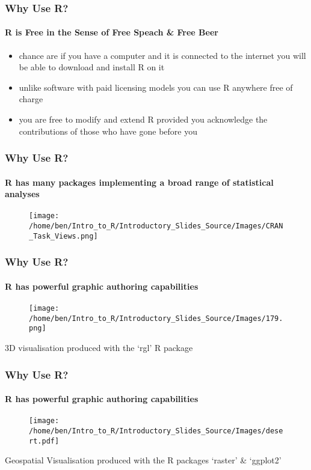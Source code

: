 \documentclass[xcolor=dvipsnames]{beamer}
\begin{document}
\begin{frame} 
\frametitle{Why Use R?}
\framesubtitle{R is Free in the Sense of Free Speach \& Free Beer}
\begin{itemize}
\item chance are if you have a computer and it is connected to the internet you will be able to download and install R on it
\newline
\item unlike software with paid licensing models you can use R anywhere free of charge
\newline
\item you are free to modify and extend R provided you acknowledge the contributions of those who have gone before you
\end{itemize}
\end{frame}

\begin{frame} 
\frametitle{Why Use R?}
\framesubtitle{R has many packages implementing a broad range of statistical analyses}

\begin{figure}
\texttt{[image: /home/ben/Intro\_to\_R/Introductory\_Slides\_Source/Images/CRAN\_Task\_Views.png]}
\end{figure}

\end{frame}

\begin{frame} 
\frametitle{Why Use R?}
\framesubtitle{R has powerful graphic authoring capabilities}

\begin{figure}
\texttt{[image: /home/ben/Intro\_to\_R/Introductory\_Slides\_Source/Images/179.png]}
\end{figure}

\tiny 3D visualisation produced with the `rgl' R package

\end{frame}

\begin{frame} 
\frametitle{Why Use R?}
\framesubtitle{R has powerful graphic authoring capabilities}

\begin{figure}
\texttt{[image: /home/ben/Intro\_to\_R/Introductory\_Slides\_Source/Images/desert.pdf]}
\end{figure}

\tiny Geospatial Visualisation produced with the R packages `raster' \& `ggplot2'

\end{frame}
\end{document}

